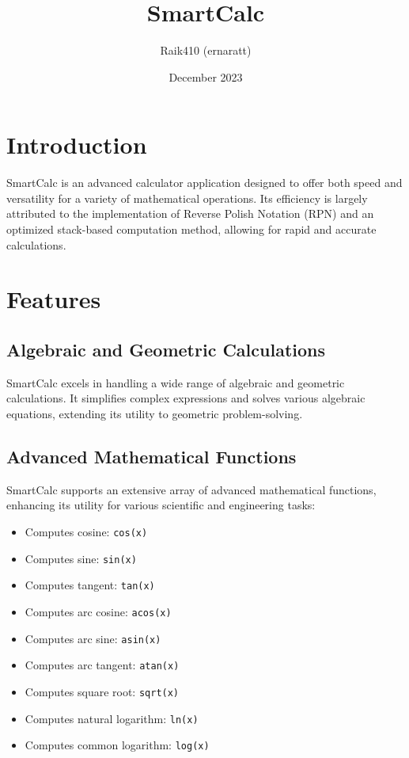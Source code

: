 \documentclass{article}
\title{SmartCalc}
\author{Raik410 (ernaratt)}
\date{December 2023}
\begin{document}
\maketitle

\section{Introduction}

SmartCalc is an advanced calculator application designed to offer both speed and versatility for a variety of mathematical operations. Its efficiency is largely attributed to the implementation of Reverse Polish Notation (RPN) and an optimized stack-based computation method, allowing for rapid and accurate calculations.

\section{Features}

\subsection{Algebraic and Geometric Calculations}

SmartCalc excels in handling a wide range of algebraic and geometric calculations. It simplifies complex expressions and solves various algebraic equations, extending its utility to geometric problem-solving.

\subsection{Advanced Mathematical Functions}

SmartCalc supports an extensive array of advanced mathematical functions, enhancing its utility for various scientific and engineering tasks:

\begin{itemize}
    \item Computes cosine: \texttt{cos(x)}
    \item Computes sine: \texttt{sin(x)}
    \item Computes tangent: \texttt{tan(x)}
    \item Computes arc cosine: \texttt{acos(x)}
    \item Computes arc sine: \texttt{asin(x)}
    \item Computes arc tangent: \texttt{atan(x)}
    \item Computes square root: \texttt{sqrt(x)}
    \item Computes natural logarithm: \texttt{ln(x)}
    \item Computes common logarithm: \texttt{log(x)}
\end{itemize}
\end{document}
